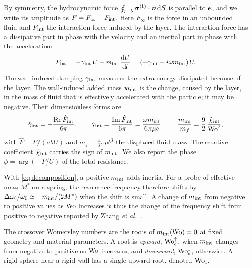 By symmetry, the hydrodynamic force $\oint_{r=b}\bm{\sigma}^{(1)}\cdot\bm{n}\,\mathrm{d} S$ is parallel to $\bm{e}$, and we write its
amplitude as $F=F_\infty+F_{\rm int}$. Here $F_\infty$ is the force in an unbounded fluid and $F_{\rm int}$ the
interaction force induced by the layer. The interaction force has a dissipative part in phase with the velocity and an
inertial part in phase with the acceleration:
\begin{equation}
  F_{\rm int}=-\gamma_{\rm int}\,U-m_{\rm int}\,\frac{\mathrm{d} U}{\mathrm{d} t}
  =\left(-\gamma_{\rm int}+i\omega m_{\rm int}\right)U .
  \label{eq:decomposition}
\end{equation}
The wall-induced damping $\gamma_{\rm int}$ measures the extra energy dissipated because of the layer. The wall-induced
added mass $m_{\rm int}$ is the change, caused by the layer, in the mass of fluid that is effectively accelerated with
the particle; it may be negative. Their dimensionless forms are
\begin{equation}
  \hat\gamma_{\rm int}=-\frac{\operatorname{Re}\hat F_{\rm int}}{6\pi},\qquad
  \hat\chi_{\rm int}=\frac{\operatorname{Im}\hat F_{\rm int}}{6\pi}=\frac{\omega m_{\rm int}}{6\pi\mu b},\qquad
  \frac{m_{\rm int}}{m_f}=\frac{9}{2}\,\frac{\hat\chi_{\rm int}}{\mathrm{Wo}^2},
  \label{eq:observables}
\end{equation}
with $\hat F=F/(\mu bU)$ and $m_f=\tfrac43\pi\rho b^3$ the displaced fluid mass. The reactive coefficient
$\hat\chi_{\rm int}$ carries the sign of $m_{\rm int}$. We also report the phase $\phi=\arg(-F/U)$ of the total
resistance.

\begin{remark}\label{rem:sign}
With \cref{eq:decomposition}, a positive $m_{\rm int}$ adds inertia. For a probe of effective mass $M^*$ on a spring,
the resonance frequency therefore shifts by $\Delta\omega_0/\omega_0\simeq-m_{\rm int}/(2M^*)$ when the shift is small.
A change of $m_{\rm int}$ from negative to positive values as $\mathrm{Wo}$ increases is thus the change of the frequency
shift from positive to negative reported by Zhang \emph{et al.}~\cite{zhang2023unsteady}.
\end{remark}

\begin{definition}\label{def:woc}
The crossover Womersley numbers are the roots of $m_{\rm int}(\mathrm{Wo})=0$ at fixed geometry and material parameters. A
root is \emph{upward}, $\mathrm{Wo}_c^{\uparrow}$, when $m_{\rm int}$ changes from negative to positive as $\mathrm{Wo}$ increases, and
\emph{downward}, $\mathrm{Wo}_c^{\downarrow}$, otherwise. A rigid sphere near a rigid wall has a single upward root, denoted
$\mathrm{Wo}_c$.
\end{definition}

